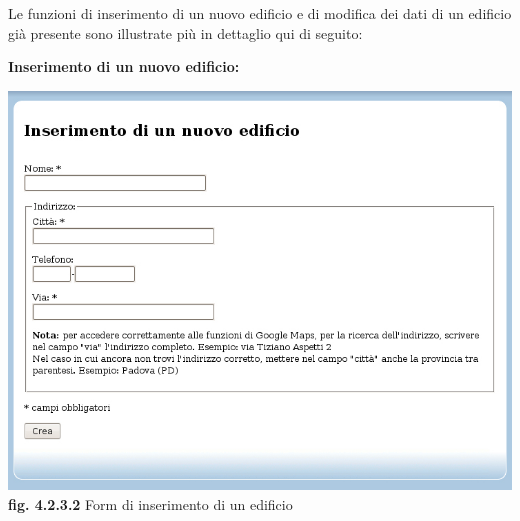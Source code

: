 \documentclass[11pt,a4paper]{article}
\begin{document}
Le funzioni di inserimento di un nuovo edificio e di modifica dei dati di un edificio già presente sono illustrate più in dettaglio qui di seguito:
\newpage
\begin{large}\textbf{Inserimento di un nuovo edificio:}\end{large}
\begin{center}
	\includegraphics[scale=0.5]{images/nuovo_edificio.jpg}\\
	\textbf{fig. 4.2.3.2} Form di inserimento di un edificio\\
\end{center}
\bigskip
\end{document}
